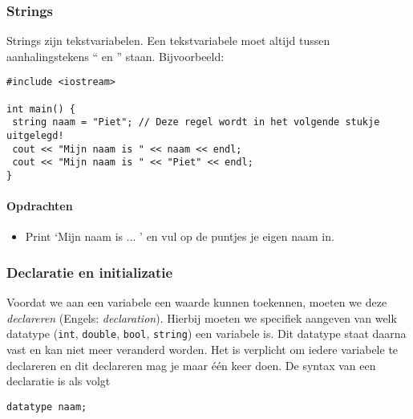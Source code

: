 \documentclass[12pt,a4paper]{article}
\newcommand{\icode}{\lstinline}
\begin{document}
\subsubsection{Strings}

Strings zijn tekstvariabelen. Een tekstvariabele moet altijd tussen aanhalingstekens `` en '' staan. 
Bijvoorbeeld: 

\begin{lstlisting}
#include <iostream> 

int main() {
 string naam = "Piet"; // Deze regel wordt in het volgende stukje uitgelegd! 
 cout << "Mijn naam is " << naam << endl;
 cout << "Mijn naam is " << "Piet" << endl; 
}
\end{lstlisting}

\paragraph{Opdrachten}
\begin{itemize} 
\item 
Print `Mijn naam is ... ' en vul op de puntjes je eigen naam in. 
\end{itemize} 

\subsubsection{Declaratie en initializatie}
Voordat we aan een variabele een waarde kunnen toekennen, moeten we deze \emph{declareren} (Engels: \emph{declaration}). 
Hierbij moeten we specifiek aangeven van welk datatype (\icode{int}, \icode{double}, \icode{bool}, 
\icode{string}) een variabele is. Dit datatype staat daarna vast en kan niet meer veranderd worden.
Het is verplicht om iedere variabele te declareren en dit declareren mag je maar één keer doen. 
De syntax van een declaratie is als volgt

\icode{datatype naam;} 
\end{document}
